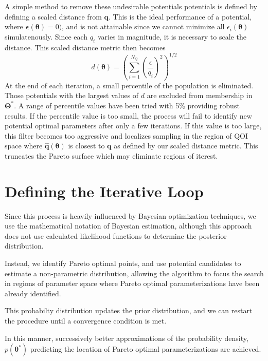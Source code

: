 	A simple method to remove these undesirable potentials potentials is defined by defining a scaled distance from $\bm{q}$.  This is the ideal performance of a potential, where $\bm{\epsilon}(\bm{\theta})=0)$, and is not attainable since we cannot minimize all $\epsilon_i(\bm{\theta})$ simulatenously.  Since each $q_i$ varies in magnitude, it is necessary to scale the distance.  This scaled distance metric then becomes
	\begin{equation}
		d(\bm{\theta}) = \left(\sum_{i=1}^{N_Q} \left(\frac{\epsilon}{q_i}\right)^2\right)^{1/2}
	\end{equation}
	At the end of each iteration, a small percentile of the population is eliminated.  Those potentials with the largest values of $d$ are excluded from membership in $\bm{\Theta}^*$.  A range of percentile values have been tried with 5\% providing robust results.  If the percentile value is too small, the process will fail to identify new potential optimal parameters after only a few iterations.  If this value is too large, this filter becomes too aggressive and localizes sampling in the region of QOI space where $\hat{\bm{q}}(\bm{\theta})$ is closest to $\bm{q}$ as defined by our scaled distance metric.  This truncates the Pareto surface which may eliminate regions of iterest.

\section{Defining the Iterative Loop}
\label{sec:iterative_loop}
Since this process is heavily influenced by Bayesian optimization techniques, we use the mathematical notation of Bayesian estimation, although this approach does not use calculated likelihood functions to determine the posterior distribution.

Instead, we identify Pareto optimal points, and use potential candidates to estimate a non-parametric distribution, allowing the algorithm to focus the search in regions of parameter space where Pareto optimal parameterizations have been already identified.

This probabilty distribution updates the prior distribution, and we can restart the procedure until a convergence condition is met.

In this manner, successively better approximations of the probability density, $p(\bm{\theta}^*)$ predicting the location of Pareto optimal parameterizations are achieved.
